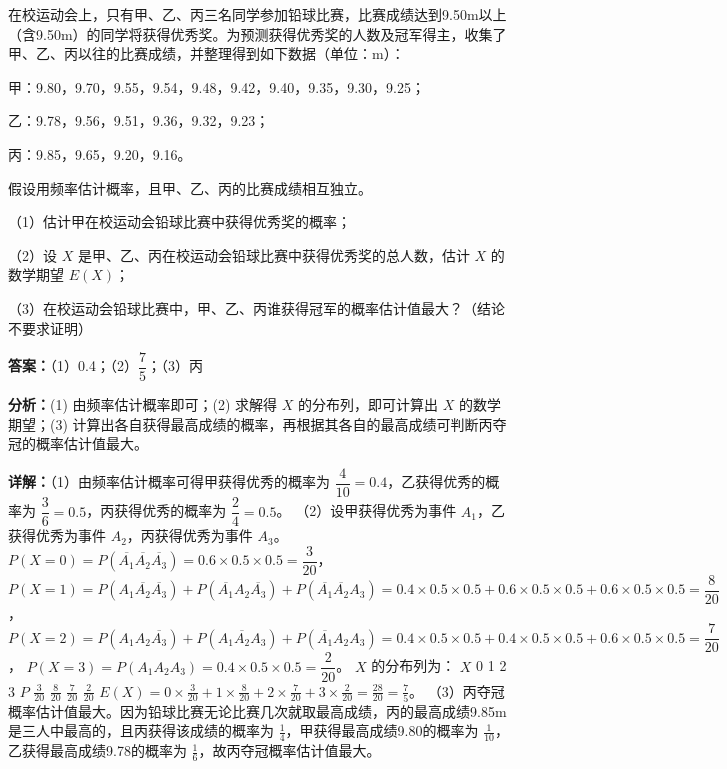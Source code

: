 \begin{question}[points=13]
在校运动会上，只有甲、乙、丙三名同学参加铅球比赛，比赛成绩达到9.50m以上（含9.50m）的同学将获得优秀奖。为预测获得优秀奖的人数及冠军得主，收集了甲、乙、丙以往的比赛成绩，并整理得到如下数据（单位：m）：

甲：9.80，9.70，9.55，9.54，9.48，9.42，9.40，9.35，9.30，9.25；

乙：9.78，9.56，9.51，9.36，9.32，9.23；

丙：9.85，9.65，9.20，9.16。

假设用频率估计概率，且甲、乙、丙的比赛成绩相互独立。

（1）估计甲在校运动会铅球比赛中获得优秀奖的概率；

（2）设 $X$ 是甲、乙、丙在校运动会铅球比赛中获得优秀奖的总人数，估计 $X$ 的数学期望 $E(X)$；

（3）在校运动会铅球比赛中，甲、乙、丙谁获得冠军的概率估计值最大？（结论不要求证明）
\begin{solution}
\textbf{答案：}（1）0.4；（2）$\dfrac{7}{5}$；（3）丙

\textbf{分析：}(1) 由频率估计概率即可；(2) 求解得 $X$ 的分布列，即可计算出 $X$ 的数学期望；(3) 计算出各自获得最高成绩的概率，再根据其各自的最高成绩可判断丙夺冠的概率估计值最大。

\textbf{详解：}（1）由频率估计概率可得甲获得优秀的概率为 $\dfrac{4}{10}=0.4$，乙获得优秀的概率为 $\dfrac{3}{6}=0.5$，丙获得优秀的概率为 $\dfrac{2}{4}=0.5$。
（2）设甲获得优秀为事件 $A_1$，乙获得优秀为事件 $A_2$，丙获得优秀为事件 $A_3$。
$P(X=0) = P(\overline{A_1}\overline{A_2}\overline{A_3}) = 0.6\times 0.5\times 0.5 = \dfrac{3}{20}$，
$P(X=1) = P(A_1\overline{A_2}\overline{A_3}) + P(\overline{A_1}A_2\overline{A_3}) + P(\overline{A_1}\overline{A_2}A_3) = 0.4\times0.5\times0.5 + 0.6\times0.5\times0.5 + 0.6\times0.5\times0.5 = \dfrac{8}{20}$，
$P(X=2) = P(A_1A_2\overline{A_3}) + P(A_1\overline{A_2}A_3) + P(\overline{A_1}A_2A_3) = 0.4\times0.5\times0.5 + 0.4\times0.5\times0.5 + 0.6\times0.5\times0.5 = \dfrac{7}{20}$，
$P(X=3) = P(A_1A_2A_3) = 0.4\times0.5\times0.5 = \dfrac{2}{20}$。
$X$ 的分布列为：
$X$ 0 1 2 3
$P$ $\frac{3}{20}$ $\frac{8}{20}$ $\frac{7}{20}$ $\frac{2}{20}$
$E(X) = 0\times\frac{3}{20} + 1\times\frac{8}{20} + 2\times\frac{7}{20} + 3\times\frac{2}{20} = \frac{28}{20} = \frac{7}{5}$。
（3）丙夺冠概率估计值最大。因为铅球比赛无论比赛几次就取最高成绩，丙的最高成绩9.85m是三人中最高的，且丙获得该成绩的概率为 $\frac{1}{4}$，甲获得最高成绩9.80的概率为 $\frac{1}{10}$，乙获得最高成绩9.78的概率为 $\frac{1}{6}$，故丙夺冠概率估计值最大。
\end{solution}
\end{question}

